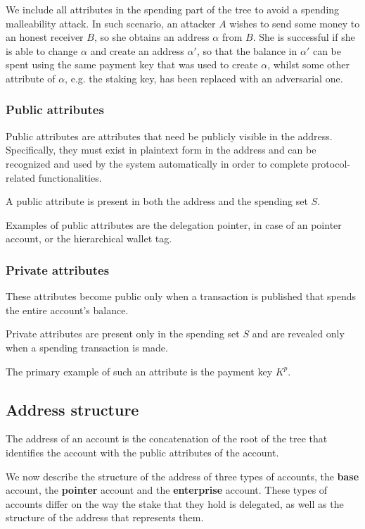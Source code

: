 We include all attributes in the spending part of the tree to avoid a spending malleability attack. In such scenario, an attacker $A$ wishes to send some money to an honest receiver $B$, so she obtains an address $\alpha$ from $B$. She is successful if she is able to change $\alpha$ and create an address $\alpha'$, so that the balance in $\alpha'$ can be spent using the same payment key that was used to create $\alpha$, whilst some other attribute of $\alpha$, e.g. the staking key, has been replaced with an adversarial one.

\subsubsection{Public attributes}

Public attributes are attributes that need be publicly visible in the address. Specifically, they must exist in plaintext form in the address and can be recognized and used by the system automatically in order to complete protocol-related functionalities.

A public attribute is present in both the address and the spending set $S$.

Examples of public attributes are the delegation pointer, in case of an pointer account, or the hierarchical wallet tag.

\subsubsection{Private attributes}

These attributes become public only when a transaction is published that spends the entire account's balance.

Private attributes are present only in the spending set $S$ and are revealed only when a spending transaction is made.

The primary example of such an attribute is the payment key $K^p$.

\subsection{Address structure}

The address of an account is the concatenation of the root of the tree that identifies the account with the public attributes of the account.

We now describe the structure of the address of three types of accounts, the \textbf{base} account, the \textbf{pointer} account and the \textbf{enterprise} account. These types of accounts differ on the way the stake that they hold is delegated, as well as the structure of the address that represents them.

